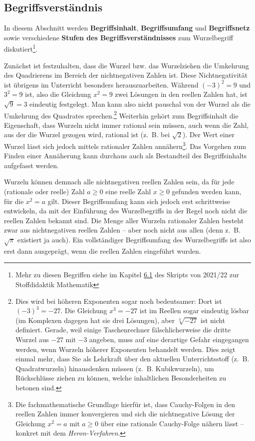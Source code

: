 \documentclass[
]{scrbook}
\theoremstyle{definition}
\theoremstyle{definition}
\theoremstyle{definition}
\theoremstyle{definition}
\theoremstyle{remark}
\begin{document}
\hypertarget{wurzel-begriffsverstaendnis}{%
\subsection{Begriffsverständnis}\label{wurzel-begriffsverstaendnis}}

In diesem Abschnitt werden \textbf{Begriffsinhalt}, \textbf{Begriffsumfang} und \textbf{Begriffsnetz} sowie verschiedene \textbf{Stufen des Begriffsverständnisses} zum Wurzelbegriff diskutiert\footnote{Mehr zu diesen Begriffen siehe im Kapitel \href{https://stoffdidaktik.heiko-etzold.de/2021/6-begriffsbildung.html}{6.1} des Skripts von 2021/22 zur Stoffdidaktik Mathematik}.

Zunächst ist festzuhalten, dass die Wurzel bzw. das Wurzelziehen die Umkehrung des Quadrierens im Bereich der nichtnegativen Zahlen ist. Diese Nichtnegativität ist übrigens im Unterricht besonders herauszuarbeiten. Während \((-3)^2 = 9\) und \(3^2= 9\) ist, also die Gleichung \(x^2 = 9\) zwei Lösungen in den reellen Zahlen hat, ist \(\sqrt{9} = 3\) eindeutig festgelegt. Man kann also nicht pauschal von der Wurzel als die Umkehrung des Quadrates sprechen.\footnote{Dies wird bei höheren Exponenten sogar noch bedeutsamer: Dort ist \((-3)^3 = -27\). Die Gleichung \(x^3 = -27\) ist im Reellen sogar eindeutig lösbar (im Komplexen dagegen hat sie drei Lösungen), aber \(\sqrt[3]{-27}\) ist nicht definiert. Gerade, weil einige Taschenrechner fälschlicherweise die dritte Wurzel aus \(-27\) mit \(-3\) angeben, muss auf eine derartige Gefahr eingegangen werden, wenn Wurzeln höherer Exponenten behandelt werden. Dies zeigt einmal mehr, dass Sie als Lehrkraft über den aktuellen Unterrichtsstoff (z.~B. Quadratwurzeln) hinausdenken müssen (z.~B. Kubikwurzeln), um Rückschlüsse ziehen zu können, welche inhaltlichen Besonderheiten zu betonen sind.} Weiterhin gehört zum Begriffsinhalt die Eigenschaft, dass Wurzeln nicht immer rational sein müssen, auch wenn die Zahl, aus der die Wurzel gezogen wird, rational ist (z.~B. bei \(\sqrt{2}\)). Der Wert einer Wurzel lässt sich jedoch mittels rationaler Zahlen annähern\footnote{Die fachmathematische Grundlage hierfür ist, dass Cauchy-Folgen in den reellen Zahlen immer konvergieren und sich die nichtnegative Lösung der Gleichung \(x^2 = a\) mit \(a\geq 0\) über eine rationale Cauchy-Folge nähern lässt -- konkret mit dem \emph{Heron-Verfahren}.}. Das Vorgehen zum Finden einer Annäherung kann durchaus auch als Bestandteil des Begriffsinhalts aufgefasst werden.

Wurzeln können demnach alle nichtnegativen reellen Zahlen sein, da für jede (rationale oder reelle) Zahl \(a\geq 0\) eine reelle Zahl \(x\geq 0\) gefunden werden kann, für die \(x^2 = a\) gilt. Dieser Begriffsumfang kann sich jedoch erst schrittweise entwickeln, da mit der Einführung des Wurzelbegriffs in der Regel noch nicht die reellen Zahlen bekannt sind. Die Menge aller Wurzeln rationaler Zahlen besteht zwar aus nichtnegativen reellen Zahlen -- aber noch nicht aus allen (denn z.~B. \(\sqrt{\pi}\) existiert ja auch). Ein vollständiger Begriffsumfang des Wurzelbegriffs ist also erst dann ausgeprägt, wenn die reellen Zahlen eingeführt wurden.
\end{document}
